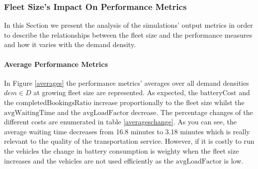 \documentclass[12pt,a4paper]{article}
\begin{document}
\tiny{
}


\normalsize
\subsubsection{Fleet Size's Impact On Performance Metrics}\label{impact}
In this Section we present the analysis of the simulations' output metrics in order to describe the relationships between the fleet size and the performance measures and how it varies with the demand density.

\paragraph{Average Performance Metrics} 
In Figure \ref{averages} the performance metrics' averages over all demand densities $dem \in D$ at growing fleet size are represented. As expected, the $\text{batteryCost}$ and the $\text{completedBookingsRatio}$ increase proportionally to the fleet size whilst the $\text{avgWaitingTime}$ and the $\text{avgLoadFactor}$ decrease. The percentage changes of the different costs are enumerated in table \ref{averageschange}. As you can see, the average waiting time decreases from 16.8 minutes to 3.18 minutes which is really relevant to the quality of the transportation service. However, if it is costly to run the vehicles the change in battery consumption is weighty when the fleet size increases and the vehicles are not used efficiently as the $\text{avgLoadFactor}$ is low.
\end{document}
